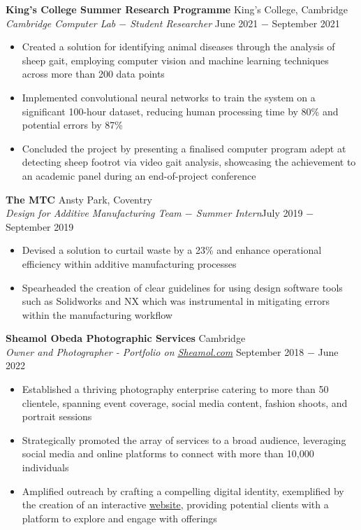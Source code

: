 \documentclass{article}
\begin{document}
\textbf{King's College Summer Research Programme} \hfill King's College, Cambridge \\
\textit{Cambridge Computer Lab $-$ Student Researcher} \hfill June 2021 $-$ September 2021
\begin{itemize}
    \item Created a solution for identifying animal diseases through the analysis of sheep gait, employing computer vision and machine learning techniques across more than 200 data points
    \item Implemented convolutional neural networks to train the system on a significant 100-hour dataset, reducing human processing time by 80\% and potential errors by 87\%
    \item Concluded the project by presenting a finalised computer program adept at detecting sheep footrot via video gait analysis, showcasing the achievement to an academic panel during an end-of-project conference%
\end{itemize} \medskip

\textbf{The MTC} \hfill Ansty Park, Coventry \\
\textit{Design for Additive Manufacturing Team $-$ Summer Intern}\hfill July 2019 $-$ September 2019
\begin{itemize}
    \item Devised a solution to curtail waste by a 23\% and enhance operational efficiency within additive manufacturing processes
    \item Spearheaded the creation of clear guidelines for using design software tools such as Solidworks and NX which was instrumental in mitigating errors within the manufacturing workflow
\end{itemize} \medskip

\textbf{Sheamol Obeda Photographic Services} \hfill Cambridge\\
\textit{Owner and Photographer - Portfolio on \href{www.sheamol.com}{\underline{Sheamol.com}}} \hfill September 2018 $-$ June 2022
\begin{itemize}
    \item Established a thriving photography enterprise catering to more than 50 clientele, spanning event coverage, social media content, fashion shoots, and portrait sessions
    \item Strategically promoted the array of services to a broad audience, leveraging social media and online platforms to connect with more than 10,000 individuals
    \item Amplified outreach by crafting a compelling digital identity, exemplified by the creation of an interactive \href{www.sheamol.com}{website}, providing potential clients with a platform to explore and engage with offerings
\end{itemize} \medskip
\end{document}
